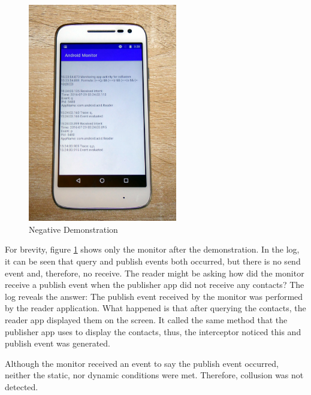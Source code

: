 \begin{figure}
	\centering
	\vspace{-12pt}
	\includegraphics[width=0.58\textwidth]{graphics/PhonePhotos/10 - NegativeTest.jpg}
	\caption{Negative Demonstration}
	\label{fig:NegativeDemonstration}
\end{figure}

For brevity, figure \ref{fig:NegativeDemonstration} shows only the monitor after the demonstration.  In the log, it can be seen that query and publish events both occurred, but there is no send event and, therefore, no receive.  The reader might be asking how did the monitor receive a publish event when the publisher app did not receive any contacts?  The log reveals the answer:  The publish event received by the monitor was performed by the reader application.  What happened is that after querying the contacts, the reader app displayed them on the screen.  It called the same method that the publisher app uses to display the contacts, thus, the interceptor noticed this and publish event was generated.  

Although the monitor received an event to say the publish event occurred, neither the static, nor dynamic conditions were met.  Therefore, collusion was not detected.



